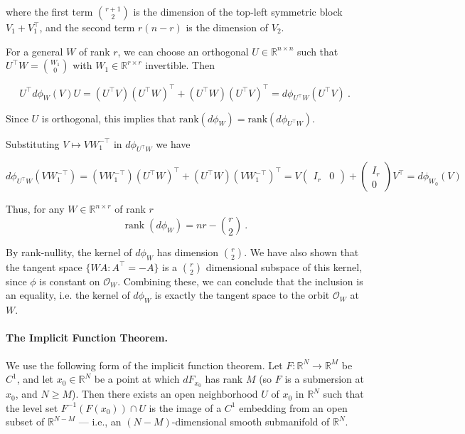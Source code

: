 \documentclass{article}
\begin{document}
where the first term $\binom{r+1}{2}$ is the dimension of the top-left symmetric block $V_1 + V_1^{\top}$, and the second term $r(n-r)$ is the dimension of $V_2$. 

For a general $W$ of rank $r$, we can choose an orthogonal $U \in \mathbb{R}^{n \times n}$ such that $U^{\top} W = \binom{W_1}{0}$ with $W_1 \in \mathbb{R}^{r \times r}$ invertible. Then

\[
U^{\top} d\phi_W(V) U = (U^{\top}V)(U^{\top}W)^{\top} + (U^{\top} W)(U^{\top}V)^{\top} = d\phi_{U^{\top}W}(U^{\top}V) \ .
\]

Since $U$ is orthogonal, this implies that $\text{rank}(d\phi_{W}) = \text{rank}(d\phi_{U^{\top}W})$.

Substituting $V \mapsto VW_{1}^{-\top}$ in $d \phi_{U^{\top}W}$ we have

\[
d\phi_{U^{\top}W}(VW_1^{-\top})= (VW_1^{-\top})(U^{\top}W)^{\top} + (U^{\top}W)(VW_1^{-\top})^{\top} = V \begin{pmatrix} I_r & 0 \end{pmatrix} + \begin{pmatrix} I_r \\ 0 \end{pmatrix} V^{\top} = d\phi_{W_0}(V)
\]

Thus, for any $W \in \mathbb{R}^{n\times r}$ of rank $r$
\[
\operatorname{rank}(d \phi_W) = nr - \binom{r}{2} \ .
\] 

By rank-nullity, the kernel of $d \phi_W$ has dimension $\binom{r}{2}$. We have also shown that the tangent space $\{ WA : A^{\top} = - A\}$ is a $\binom{r}{2}$ dimensional subspace of this kernel, since $\phi$ is constant on $\mathcal{O}_W$. Combining these, we can conclude that the inclusion is an equality, i.e. the kernel of $d \phi_W$ is exactly the tangent space to the orbit $\mathcal{O}_W$ at $W$. 


\paragraph{The Implicit Function Theorem.}

We use the following form of the implicit function theorem. Let $F : \mathbb{R}^N \to \mathbb{R}^M$ be $C^1$, and let $x_0 \in \mathbb{R}^N$ be a point at which $dF_{x_0}$ has rank $M$ (so $F$ is a submersion at $x_0$, and $N \geq M$). Then there exists an open neighborhood $U$ of $x_0$ in $\mathbb{R}^N$ such that the level set $F^{-1}(F(x_0)) \cap U$ is the image of a $C^1$ embedding from an open subset of $\mathbb{R}^{N-M}$ — i.e., an $(N-M)$-dimensional smooth submanifold of $\mathbb{R}^N$.
\end{document}
